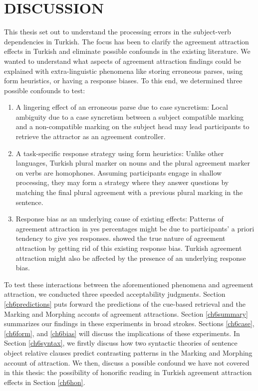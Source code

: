 
\chapter{DISCUSSION} \label{ch:discussion}

This thesis set out to understand the processing errors in the subject-verb dependencies in Turkish. The focus has been to clarify the agreement attraction effects in Turkish and eliminate possible confounds in the existing literature. We wanted to understand what aspects of agreement attraction findings could be explained with extra-linguistic phenomena like storing erroneous parses, using form heuristics, or having a response biases. To this end, we determined three possible confounds to test:

\begin{enumerate}[label=(\roman*)]
    \item {A lingering effect of an erroneous parse due to case syncretism:} Local ambiguity due to a case syncretism between a subject compatible marking and a non-compatible marking on the subject head may lead participants to retrieve the attractor as an agreement controller.
    \item {A task-specific response strategy using form heuristics:} Unlike other languages, Turkish plural marker on nouns and the plural agreement marker on verbs are homophones. Assuming participants engage in shallow processing, they may form a strategy where they answer questions by matching the final plural agreement with a previous plural marking in the sentence.
    \item {Response bias as an underlying cause of existing effects:} Patterns of agreement attraction in yes percentages might be due to participants' a priori tendency to give yes responses.  showed the true nature of agreement attraction by getting rid of this existing response bias. Turkish agreement attraction might also be affected by the presence of an underlying response bias.
\end{enumerate}

To test these interactions between the aforementioned phenomena and agreement attraction, we conducted three speeded acceptability judgments. Section \ref{ch6predictions} puts forward the predictions of the cue-based retrieval and the Marking and Morphing acconts of agreement attractions. Section \ref{ch6summary} summarizes our findings in these experiments in broad strokes. Sections \ref{ch6case}, \ref{ch6form}, and \ref{ch6bias} will discuss the implications of these experiments. In Section \ref{ch6syntax}, we firstly discuss how two syntactic theories of sentence object relative clauses predict contrasting patterns in the Marking and Morphing account of attraction. We then, discuss a possible confound we have not covered in this thesis: the possibility of honorific reading in Turkish agreement attraction effects in Section \ref{ch6hon}.


